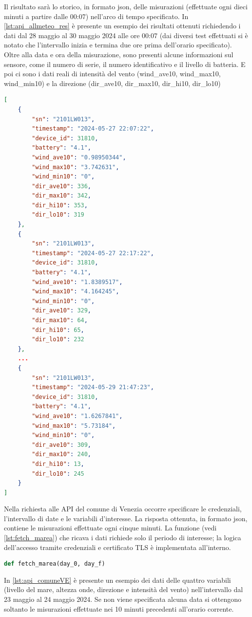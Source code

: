 \documentclass[./main.tex]{subfiles}
\begin{document}
Il risultato sarà lo storico, in formato json, delle misurazioni (effettuate ogni dieci minuti a partire dalle 00:07) nell'arco di tempo specificato. In \autoref{lst:api_allmeteo_res} è presente un esempio dei risultati ottenuti richiedendo i dati dal 28 maggio al 30 maggio 2024 alle ore 00:07 (dai diversi test effettuati si è notato che l'intervallo inizia e termina due ore prima dell'orario specificato). Oltre alla data e ora della misurazione, sono presenti alcune informazioni sul sensore, come il numero di serie, il numero identificativo e il livello di batteria. E poi ci sono i dati reali di intensità del vento (wind\_ave10, wind\_max10, wind\_min10) e la direzione (dir\_ave10, dir\_max10, dir\_hi10, dir\_lo10)
\begin{lstlisting}[language=json, 
    caption={Porzione di storico delle misurazioni di direzione e intensità del vento effettuate nel periodo tra il 28 maggio e il 30 maggio 2024 dal sensore Davis Vantage PRO posto sulla piattaforma Acqua Alta. I dati vengono richiesti all'API allmeteo.}, 
    label=lst:api_allmeteo_res]
[
    {
        "sn": "2101LW013", 
        "timestamp": "2024-05-27 22:07:22", 
        "device_id": 31810, 
        "battery": "4.1",
        "wind_ave10": "0.98950344",
        "wind_max10": "3.742631", 
        "wind_min10": "0",
        "dir_ave10": 336, 
        "dir_max10": 342,
        "dir_hi10": 353,
        "dir_lo10": 319
    },
    {
        "sn": "2101LW013",
        "timestamp": "2024-05-27 22:17:22",
        "device_id": 31810,
        "battery": "4.1",
        "wind_ave10": "1.8389517",
        "wind_max10": "4.164245",
        "wind_min10": "0",
        "dir_ave10": 329,
        "dir_max10": 64,
        "dir_hi10": 65,
        "dir_lo10": 232
    },
    ...
    {
        "sn": "2101LW013",
        "timestamp": "2024-05-29 21:47:23",
        "device_id": 31810,
        "battery": "4.1",
        "wind_ave10": "1.6267841",
        "wind_max10": "5.73184",
        "wind_min10": "0",
        "dir_ave10": 309,
        "dir_max10": 240,
        "dir_hi10": 13,
        "dir_lo10": 245
    }
]
\end{lstlisting}

Nella richiesta alle API del comune di Venezia occorre specificare le credenziali, l'intervallo di date e le variabili d'interesse.  La risposta ottenuta, in formato json, contiene le misurazioni effettuate ogni cinque minuti. La funzione (vedi \autoref{lst:fetch_marea}) che ricava i dati richiede solo il periodo di interesse; la logica dell'accesso tramite credenziali e certificato TLS è implementata all'interno.
\begin{lstlisting}[language=python,
    caption={Definizione funzione per ricavare i dati di livello del mare, altezza d'onda, direzione e intensità del vento.},
    label=lst:fetch_marea]
    def fetch_marea(day_0, day_f)
\end{lstlisting}
In \autoref{lst:api_comuneVE} è presente un esempio dei dati delle quattro variabili (livello del mare, altezza onde, direzione e intensità del vento) nell'intervallo dal 23 maggio al 24 maggio 2024. Se non viene specificata alcuna data si ottengono soltanto le misurazioni effettuate nei 10 minuti precedenti all'orario corrente.
\end{document}
